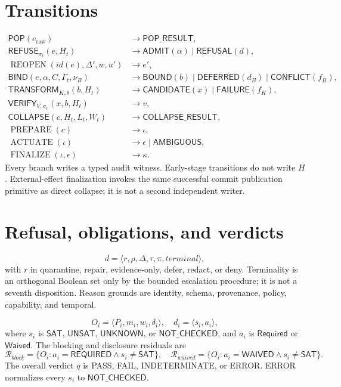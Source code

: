 \documentclass[11pt,openany]{book}
\newcommand{\Pop}{\mathsf{POP}}
\newcommand{\Refuse}{\mathsf{REFUSE}}
\newcommand{\Bind}{\mathsf{BIND}}
\newcommand{\Transform}{\mathsf{TRANSFORM}}
\newcommand{\Verify}{\mathsf{VERIFY}}
\newcommand{\Collapse}{\mathsf{COLLAPSE}}
\newcommand{\Waived}{\mathsf{WAIVED}}
\newcommand{\Required}{\mathsf{REQUIRED}}
\begin{document}
\section{Transitions}
\[
\begin{aligned}
 \Pop(e_{\mathrm{raw}}) &\to \mathsf{POP\_RESULT},\\
 \Refuse_{\sigma_t}(e,H_t) &\to
   \mathsf{ADMIT}(\alpha)\mid\mathsf{REFUSAL}(d),\\
 \operatorname{REOPEN}(id(e),\Delta',w,u') &\to e',\\
 \Bind(e,\alpha,C,\Gamma_t,\nu_B) &\to
   \mathsf{BOUND}(b)\mid\mathsf{DEFERRED}(d_B)\mid\mathsf{CONFLICT}(f_B),\\
 \Transform_{K,\theta}(b,H_t) &\to
   \mathsf{CANDIDATE}(x)\mid\mathsf{FAILURE}(f_K),\\
 \Verify_{V,\sigma_v}(x,b,H_t) &\to v,\\
 \Collapse(c,H_t,L_t,W_t) &\to \mathsf{COLLAPSE\_RESULT},\\
 \operatorname{PREPARE}(c)&\to\iota,\\
 \operatorname{ACTUATE}(\iota)&\to\epsilon\mid\mathsf{AMBIGUOUS},\\
 \operatorname{FINALIZE}(\iota,\epsilon)&\to\kappa .
\end{aligned}
\]
Every branch writes a typed audit witness. Early-stage transitions do not
write \(H\). External-effect finalization invokes the same successful commit
publication primitive as direct collapse; it is not a second independent
writer.

\section{Refusal, obligations, and verdicts}
\[
 d=\langle r,\rho,\Delta,\tau,\pi,terminal\rangle ,
\]
with \(r\) in quarantine, repair, evidence-only, defer, redact, or deny.
Terminality is an orthogonal Boolean set only by the bounded escalation
procedure; it is not a seventh disposition. Reason grounds are identity,
schema, provenance, policy, capability, and temporal.

\[
 O_i=\langle P_i,m_i,w_i,\delta_i\rangle,\quad
 d_i=\langle s_i,a_i\rangle ,
\]
where \(s_i\) is \(\mathsf{SAT}\), \(\mathsf{UNSAT}\), \(\mathsf{UNKNOWN}\), or
\(\mathsf{NOT\_CHECKED}\), and \(a_i\) is \(\mathsf{Required}\)
or \(\mathsf{Waived}\). The blocking and disclosure residuals are
\[
 \mathcal R_{block}=\{O_i:a_i=\Required\land s_i\neq\mathsf{SAT}\},
 \quad
 \mathcal R_{waived}=\{O_i:a_i=\Waived\land s_i\neq\mathsf{SAT}\}.
\]
The overall verdict \(q\) is PASS, FAIL, INDETERMINATE, or ERROR. ERROR
normalizes every \(s_i\) to \(\mathsf{NOT\_CHECKED}\).
\end{document}
